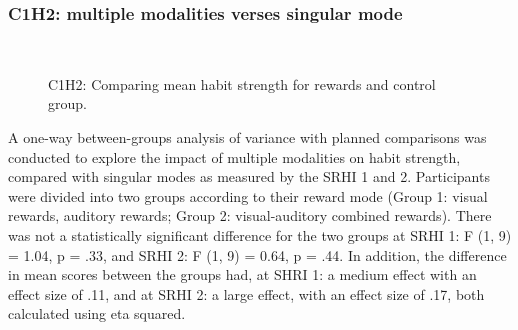 \documentclass{scaffold/sigchi}
\begin{document}
\subsubsection{C1H2: multiple modalities verses singular mode}


\begin{figure}
  \centering
  \caption{C1H2: Comparing mean habit strength for rewards and control group.}~\label{fig:habit_4_item_survey1_v_survey2}
\end{figure}

A one-way between-groups analysis of variance with planned comparisons was conducted to explore the
impact of multiple modalities on habit strength, compared with singular modes as measured by the SRHI 1 and 2. Participants were divided into two groups according to their reward mode (Group 1: visual rewards, auditory rewards; Group 2: visual-auditory combined rewards). There was not a
statistically significant difference for the two groups at SRHI 1: F (1, 9) = 1.04, p = .33, and SRHI 2: F (1, 9) = 0.64, p = .44. In addition, the difference in mean scores between the groups had, at SHRI 1: a medium effect with an effect size of .11, and at SRHI 2: a large effect, with an effect size of .17, both calculated using eta squared.
\end{document}
